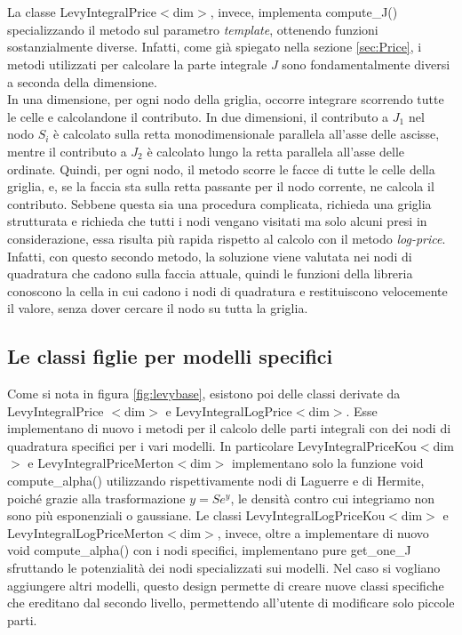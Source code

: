 \documentclass[a4paper,10pt]{report}
\theoremstyle{plain}
\theoremstyle{definition}
\theoremstyle{remark}
\begin{document}
\\\\
La classe \textsf{LevyIntegralPrice$<$dim$>$}, invece, implementa \textsf{compute\_J()} specializzando il metodo sul parametro \emph{template}, ottenendo funzioni sostanzialmente diverse. Infatti, come già spiegato nella sezione \ref{sec:Price}, i metodi utilizzati per calcolare la parte integrale $J$ sono fondamentalmente diversi a seconda della dimensione.\\In una dimensione, per ogni nodo della griglia, occorre integrare scorrendo tutte le celle e calcolandone il contributo. In due dimensioni, il contributo a $J_1$ nel nodo $S_i$ è calcolato sulla retta monodimensionale parallela all'asse delle ascisse, mentre il contributo a $J_2$ è calcolato lungo la retta parallela all'asse delle ordinate. Quindi, per ogni nodo, il metodo scorre le facce di tutte le celle della griglia, e, se la faccia sta sulla retta passante per il nodo corrente, ne calcola il contributo. Sebbene questa sia una procedura complicata, richieda una griglia strutturata e richieda che tutti i nodi vengano visitati ma solo alcuni presi in considerazione, essa risulta più rapida rispetto al calcolo con il metodo \emph{log-price}. Infatti, con questo secondo metodo, la soluzione viene valutata nei nodi di quadratura che cadono sulla faccia attuale, quindi le funzioni della libreria conoscono la cella in cui cadono i nodi di quadratura e restituiscono velocemente il valore, senza dover cercare il nodo su tutta la griglia.

\subsection{Le classi figlie per modelli specifici}

Come si nota in figura \ref{fig:levybase}, esistono poi delle classi derivate da \textsf{LevyIntegralPrice $<$dim$>$} e \textsf{LevyIntegralLogPrice$<$dim$>$}. Esse implementano di nuovo i metodi per il calcolo delle parti integrali con dei nodi di quadratura specifici per i vari modelli. In particolare \textsf{LevyIntegralPriceKou$<$dim$>$} e \textsf{LevyIntegralPriceMerton$<$dim$>$} implementano solo la funzione \textsf{void compute\_alpha()} utilizzando rispettivamente nodi di Laguerre e di Hermite, poich\'e grazie alla trasformazione $y=Se^y$, le densit\`a contro cui integriamo non sono pi\`u esponenziali o gaussiane. Le classi \textsf{LevyIntegralLogPriceKou$<$dim$>$} e {LevyIntegralLogPriceMerton$<$dim$>$}, invece, oltre a implementare di nuovo \textsf{void compute\_alpha()} con i nodi specifici, implementano pure \textsf{get\_one\_J} sfruttando le potenzialit\`a dei nodi specializzati sui modelli. Nel caso si vogliano aggiungere altri modelli, questo design permette di creare nuove classi specifiche che ereditano dal secondo livello, permettendo all'utente di modificare solo piccole parti.
\end{document}
